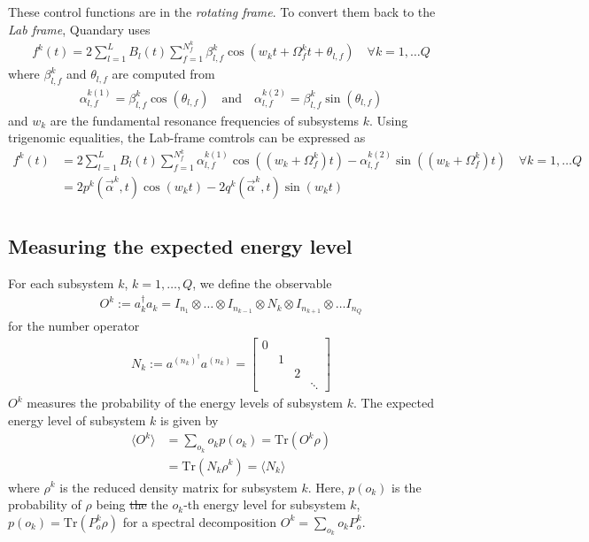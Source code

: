 \documentclass[letterpaper]{article}
\newcommand{\YC}[1]{{\textcolor{Bronze}{#1}}}
\begin{document}
These control functions are in the \textit{rotating frame}. To convert them back
to the \textit{Lab frame}, Quandary uses
\begin{align}
  f^k(t) = 2 \sum_{l=1}^L B_l(t) \sum_{f=1}^{N_f^k} \beta_{l,f}^k \cos(w_k t +
  \Omega_f^k t + \theta_{l,f}) \quad \forall k=1,\dots Q
\end{align}
where $\beta_{l,f}^k$ and $\theta_{l,f}$ are computed from
\begin{align}
  \alpha_{l,f}^{k(1)} = \beta_{l,f}^k \cos(\theta_{l,f}) \quad \text{and} \quad
  \alpha_{l,f}^{k(2)} = \beta_{l,f}^k \sin(\theta_{l,f})
\end{align}
and $w_k$ are the fundamental resonance frequencies of subsystems $k$. Using
trigenomic equalities, the Lab-frame comtrols can be expressed as
\begin{align}
  f^k(t) &= 2 \sum_{l=1}^L B_l(t) \sum_{f=1}^{N_f^k} \alpha_{l,f}^{k(1)} \cos((w_k
  + \Omega_f^k) t) - \alpha_{l,f}^{k(2)}\sin((w_k + \Omega_f^k) t) \quad \forall
  k=1,\dots Q \\
         &= 2 p^k(\vec{\alpha}^k, t) \cos(w_k t) - 2 q^k(\vec{\alpha}^k,
         t)\sin(w_k t) \\
\end{align}

\subsection{Measuring the expected energy level}\label{sec:expectedenergy}
For each subsystem $k$, $k=1,\dots, Q$, we define the observable 
\begin{align}
  O^k := a_k^\dag a_k  = I_{n_1} \otimes \dots \otimes I_{n_{k-1}} \otimes  N_k
  \otimes I_{n_{k+1}} \otimes \dots I_{n_Q} 
\end{align}
for the number operator 
\begin{align}
  N_k := a^{(n_k)^\dag} a^{(n_k)} = \begin{bmatrix} 
   0 &    &    & \\
     &  1 &    &\\
     &    &  2 &\\
     &    &    & \ddots 
  \end{bmatrix}
\end{align}
$O^k$ measures the probability of the energy levels of subsystem $k$. The
expected energy level of subsystem $k$ is given by 
\begin{align}
  \langle O^k \rangle &= \sum_{o_k} o_k p(o_k)  = \mbox{Tr}(O^k\rho) \\
   & = \mbox{Tr}(N_k \rho^k)  = \langle N_k\rangle
\end{align}
where $\rho^k$ is the reduced density matrix for subsystem $k$. Here, $p(o_k)$
is the probability of $\rho$ being \YC{\st{the}} the $o_k$-th energy level for
subsystem $k$, $p(o_k) = \mbox{Tr}(P^k_o \rho)$ for a spectral decomposition
$O^k = \sum_{o_k} o_kP^k_o$. 
\end{document}
